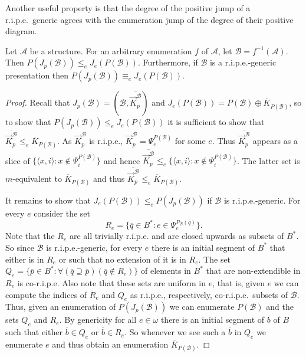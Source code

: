 \documentclass[11pt]{amsart}
\newcommand{\A}{{\mathcal{A}}}
\newcommand{\B}{{\mathcal{B}}}
\renewcommand{\bar}[1]{\overline{#1}}
\begin{document}
Another useful property is that the degree of the positive jump of a r.i.p.e.\ generic agrees with the enumeration jump of the degree of their positive diagram.
\begin{proposition}\label{propn generic}
Let $\A$ be a structure. For an arbitrary enumeration $f$ of $\A$, let $\B = f^{-1}(\A)$. Then $P(J_p(\B)) \leq_e J_e(P(\B))$. Furthermore, if $\B$ is a r.i.p.e.-generic presentation then $P(J_p(\B)) \equiv_e J_e(P(\B))$.
\end{proposition}
\begin{proof}
Recall that $J_p(\B) = (\B, \overline{\vec K_p^{\B}})$ and $J_e(P(\B)) = P(\B) \oplus \overline{K}_{P(\B)}$, so to show that $P(J_p(\B)) \leq_e J_e(P(\B))$ it is sufficient to show that $\overline{\vec K_p^{\B}} \leq_e \overline{K}_{P(\B)}$.
As $\vec K_p^{\B}$ is r.i.p.e., $\vec K_p^{\B} = \Psi^{P(\B)}_e$ for some $e$. Thus $\overline{\vec K_p^{\B}}$ appears as a slice of $\{\langle x,i \rangle : x \not \in \Psi^{P(\B)}_i\}$ and hence $\overline{\vec K_p^{\B}}\leq_e\{\langle x,i \rangle : x \not \in \Psi^{P(\B)}_i\}$. The latter set is $m$-equivalent to $\overline{K}_{P(\B)}$ and thus $\overline{\vec K_p^{\B}}\leq_e\overline{K}_{P(\B)}$.

It remains to show that $J_e(P(\B))\leq_e P(J_p(\B))$ if $\B$ is r.i.p.e.-generic. For every $e$ consider the set
\[ R_e = \{\bar q\in B^* : e \in \Psi_e^{P_\B(\bar q)}\}.\]
Note that the $R_e$ are all trivially r.i.p.e. and are closed upwards as subsets of $B^*$. So since $\B$ is r.i.p.e.-generic, for every $e$ there is an initial segment of $B^*$ that either is in $R_e$ or such that no extension of it is in $R_e$. The set $Q_e=\{ \bar p\in B^* :\forall (\bar q\supseteq \bar p) (\bar q \not \in R_e)\}$ of elements in $B^*$ that are non-extendible in $R_e$ is co-r.i.p.e. Also note that these sets are uniform in $e$, that is, given $e$ we can compute the indices of $R_e$ and $Q_e$ as r.i.p.e., respectively, co-r.i.p.e.\ subsets of $\B$. 
Thus, given an enumeration of $P(J_p(\B))$ we can enumerate $P(\B)$ and the sets $Q_e$ and $R_e$. By genericity for all $e\in \omega$ there is an initial segment of $\bar b$ of $B$ such that either $\bar b\in Q_e$ or $\bar b \in R_e$. So whenever we see such a $\bar b$ in $Q_e$ we enumerate $e$ and thus obtain an enumeration $\overline K_{P(\B)}$.
\end{proof} 
\end{document}
